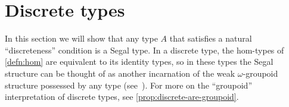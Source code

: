 \documentclass[12pt]{amsart}
\theoremstyle{plain}
\theoremstyle{definition}
\theoremstyle{remark}
\numberwithin{equation}{section}
\newcommand{\idfunc}[1]{\mathsf{Id}_{#1}}
\newcommand{\two}{\mathbb{2}}
\newcommand{\iscomp}[2]{\mathsf{comp}_{#1,#2}}
\begin{document}
\begin{comment}
The geometric idea is to observe that the square $\two \times \two \to C$
\[
\begin{tikzcd}[column sep=huge]
jfa \arrow[r, "{\delta\circ\beta}_{fa}"] \arrow[dr, "{\delta\circ\beta}_{(\gamma\circ\alpha)_a}" description] \arrow[d, "j(\gamma\circ\alpha)_a"'] & \ell fa \arrow[d, "\ell(\gamma\circ\alpha)_a"] \\ jha \arrow[r, "(\delta\circ\beta)_{ha}"'] & \ell ha
\end{tikzcd}
\]
defining the component of $(\delta\circ\beta)\ast(\gamma\circ\alpha)$ at $a : A$ appears as an interior face of a diagram $\Delta^2 \times \Delta^2 \to C$
\[
\begin{tikzcd}
jfa \arrow[r, "\beta_{fa}"] \arrow[dr, "\beta_{\alpha_a}" description] \arrow[d, "j\alpha_a"'] & kfa \arrow[d, "k\alpha_a"] \arrow[r, "\delta_{fa}"] \arrow[dr, "\delta_{\alpha_a}" description] & \ell fa \arrow[d, "\ell \alpha_a"] \\ jga \arrow[d, "j\gamma_a"'] \arrow[r, "\beta_{ga}"'] \arrow[dr, "\beta_{\gamma_a}" description] & kga \arrow[r, "\delta_{ga}"'] \arrow[dr, "\delta_{\gamma_a}" description] \arrow[d, "k\gamma_a"]  & \ell ga \arrow[d, "j\gamma_a"] \\ jha \arrow[r, "\beta_{ha}"'] & kha \arrow[r, "\delta_{ha}"'] & jha
\end{tikzcd}
\]
The ``diagonal 2-simplex'' in this larger diagram defines a witness that $\delta_{\gamma_a} \circ\beta_{\alpha_a} = (\delta\circ\beta)_{(\gamma\circ\alpha)_a}$. This diagram is simply the composite of the ``uncurried'' maps
\[
\xymatrix@C=50pt{
A \times \Delta^2 \times\Delta^2 \ar[r]^-{{\iscomp \gamma \alpha}\times\idfunc{\Delta^2}} & B \times\Delta^2 \ar[r]^-{\iscomp \delta \beta} & C
}
\]
The diagonal 2-simplex $\Delta^2 \to \Delta^2 \times \Delta^2$ defines the desired witness that $(\delta\circ\beta)\ast(\gamma\circ\alpha)$ is a composite of $(\beta\ast\alpha)$ followed by $(\delta\ast\gamma)$.

TODO: Figure out how to re-express all of this as saying that since $B$ and $C$ are Segal something or other is contractible.
\end{comment}


\section{Discrete types}
\label{sec:discrete-types}

In this section we will show that any type $A$ that satisfies a natural ``discreteness'' condition is a Segal type.  In a discrete type, the hom-types of \cref{defn:hom} are equivalent to its identity types, so in these types the Segal structure can be thought of as another incarnation of the weak $\omega$-groupoid structure possessed by any type (see~\cite{vdbg:oogpds,pll:oogpds}). For more on the ``groupoid'' interpretation of discrete types, see \cref{prop:discrete-are-groupoid}.
\end{document}
